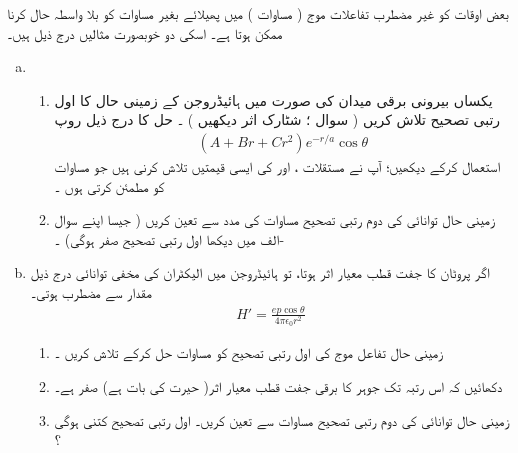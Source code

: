 بعض اوقات    کو غیر مضطرب تفاعلات موج (  مساوات ) میں پھیلائے   بغیر مساوات   کو بلا واسطہ حال کرنا ممکن ہوتا ہے۔  اسکی دو   خوبصورت مثالیں  درج ذیل ہیں۔
\begin{enumerate}[a.]
\item
 \begin{enumerate}[1.]
 \item
  یکساں بیرونی برقی میدان   کی صورت  میں ہائیڈروجن  کے  زمینی حال کا   اول رتبی  تصحیح  تلاش کریں ( سوال    ؛ شٹارک  اثر دیکھیں ) ۔ حل کا  درج ذیل روپ 
\begin{align*}
(A+Br+Cr^{2})e^{-r/a}\cos\theta
\end{align*}
استعمال کرکے دیکھیں؛  آپ نے مستقلات   ،  اور   کی ایسی قیمتیں تلاش کرنی ہیں جو مساوات   کو مطمئن کرتی  ہوں ۔
\item
 زمینی حال توانائی کی  دوم  رتبی تصحیح   مساوات    کی مدد سے  تعین کریں ( جیسا اپنے سوال  -الف  میں دیکھا    اول  رتبی تصحیح  صفر ہوگی) ۔ 
\end{enumerate}
\item
 اگر پروٹان کا   جفت قطب  معیار اثر   ہوتا،  تو  ہائیڈروجن میں  الیکٹران  کی مخفی توانائی درج ذیل مقدار سے مضطرب ہوتی۔
\begin{align*}
H'=\frac{ep\cos\theta}{4\pi\epsilon _0r^{2}}
\end{align*}
\begin{enumerate}[1.]
\item
 زمینی حال تفاعل موج کی  اول  رتبی تصحیح  کو مساوات   حل کرکے تلاش کریں ۔
\item
 دکھائیں  کہ  اس رتبہ تک جوہر کا    برقی جفت قطب معیار اثر( حیرت کی بات ہے)  صفر ہے۔ 
\item
 زمینی حال توانائی کی   دوم  رتبی تصحیح  مساوات   سے تعین کریں۔  اول رتبی  تصحیح  کتنی  ہوگی ؟
\end{enumerate}
\end{enumerate}

